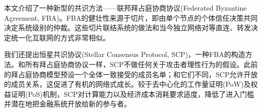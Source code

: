 \abstract{}
本文介绍了一种新型的共识方法——联邦拜占庭协商协议(Federated Byzantine Agreement, FBA)。FBA的健壮性来源于{\quorum}切片，即由单个节点的个体信任决策共同决定系统级别的仲裁。这些切片联结系统的做法和当今独立网络对等直连、转发决定统一化互联网的方式非常相似。

我们还提出恒星共识协议(Stellar Consensus Protocol, SCP)，一种FBA的构造方法。和所有拜占庭协商协议一样，SCP不做任何关于攻击者理性行为的假设。此前的拜占庭协商模型预设一个全体一致接受的成员名单；和它们不同，SCP允许开放的成员关系，这促进了有机的网络式成长。较于去中心化的工作量证明(PoW)及权益证明(PoS)机制，SCP对计算能力以及经济成本消耗要求适度，降低了进入门槛并潜在地把金融系统开放给新的参与者。